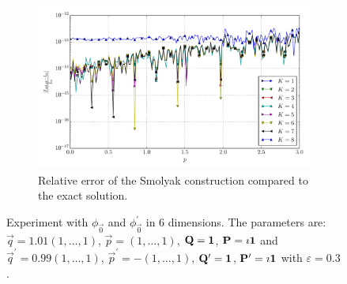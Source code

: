 \documentclass[a4paper,10pt]{article}
\begin{document}
\begin{figure}[ht!]
\begin{subfigure}[t]{0.5\linewidth}
    \includegraphics[width=\linewidth]{./plots/tp_sg_6d_conv_p_(0,0,0,0,0,0)_(0,0,0,0,0,0)_err_rel_nsd_gk.pdf}
    \caption{Relative error of the Smolyak construction compared to the exact solution.}
    \label{fig:tp_sg_6d_conv_p_000000_000000_err_rel_nsd_gk}
  \end{subfigure}
  \label{fig:tp_sg_6d_conv_p_000000_000000}
  \caption{Experiment with $\phi_{\vec{0}}$ and $\phi_{\vec{0}}^{\prime}$
  in 6 dimensions.
  The parameters are:
  $\vec{q} = 1.01 (1,\ldots,1)$,
  $\vec{p} = (1,\ldots,1)$,
  $\mathbf{Q} = \mathbf{1}$,
  $\mathbf{P} = \imath \mathbf{1}$
  and
  $\vec{q}^\prime = 0.99 (1,\ldots,1)$,
  $\vec{p}^\prime = -(1,\ldots,1)$,
  $\mathbf{Q}^\prime = \mathbf{1}$,
  $\mathbf{P}^\prime = \imath \mathbf{1}$
  with $\varepsilon=0.3$.}
\end{figure}
\end{document}
